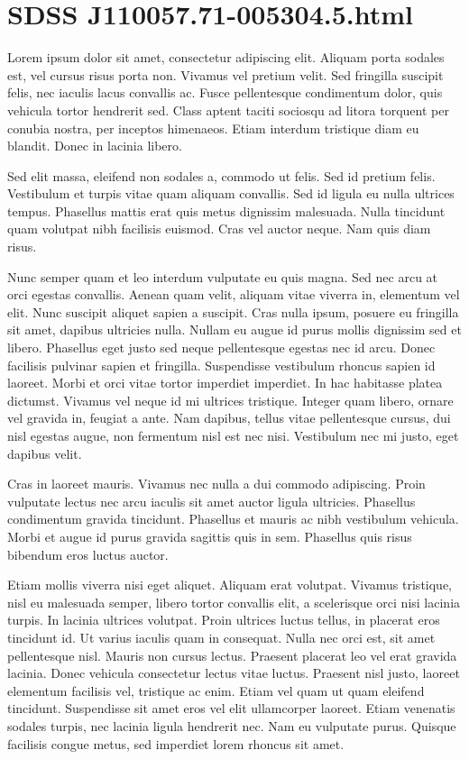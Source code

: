 \documentclass{emulateapj}
\begin{document}
\section{SDSS J110057.71-005304.5.html}
Lorem ipsum dolor sit amet, consectetur adipiscing elit. Aliquam porta sodales est, vel cursus risus porta non. Vivamus vel pretium velit. Sed fringilla suscipit felis, nec iaculis lacus convallis ac. Fusce pellentesque condimentum dolor, quis vehicula tortor hendrerit sed. Class aptent taciti sociosqu ad litora torquent per conubia nostra, per inceptos himenaeos. Etiam interdum tristique diam eu blandit. Donec in lacinia libero.

Sed elit massa, eleifend non sodales a, commodo ut felis. Sed id pretium felis. Vestibulum et turpis vitae quam aliquam convallis. Sed id ligula eu nulla ultrices tempus. Phasellus mattis erat quis metus dignissim malesuada. Nulla tincidunt quam volutpat nibh facilisis euismod. Cras vel auctor neque. Nam quis diam risus.

Nunc semper quam et leo interdum vulputate eu quis magna. Sed nec arcu at orci egestas convallis. Aenean quam velit, aliquam vitae viverra in, elementum vel elit. Nunc suscipit aliquet sapien a suscipit. Cras nulla ipsum, posuere eu fringilla sit amet, dapibus ultricies nulla. Nullam eu augue id purus mollis dignissim sed et libero. Phasellus eget justo sed neque pellentesque egestas nec id arcu. Donec facilisis pulvinar sapien et fringilla. Suspendisse vestibulum rhoncus sapien id laoreet. Morbi et orci vitae tortor imperdiet imperdiet. In hac habitasse platea dictumst. Vivamus vel neque id mi ultrices tristique. Integer quam libero, ornare vel gravida in, feugiat a ante. Nam dapibus, tellus vitae pellentesque cursus, dui nisl egestas augue, non fermentum nisl est nec nisi. Vestibulum nec mi justo, eget dapibus velit.

Cras in laoreet mauris. Vivamus nec nulla a dui commodo adipiscing. Proin vulputate lectus nec arcu iaculis sit amet auctor ligula ultricies. Phasellus condimentum gravida tincidunt. Phasellus et mauris ac nibh vestibulum vehicula. Morbi et augue id purus gravida sagittis quis in sem. Phasellus quis risus bibendum eros luctus auctor.

Etiam mollis viverra nisi eget aliquet. Aliquam erat volutpat. Vivamus tristique, nisl eu malesuada semper, libero tortor convallis elit, a scelerisque orci nisi lacinia turpis. In lacinia ultrices volutpat. Proin ultrices luctus tellus, in placerat eros tincidunt id. Ut varius iaculis quam in consequat. Nulla nec orci est, sit amet pellentesque nisl. Mauris non cursus lectus. Praesent placerat leo vel erat gravida lacinia. Donec vehicula consectetur lectus vitae luctus. Praesent nisl justo, laoreet elementum facilisis vel, tristique ac enim. Etiam vel quam ut quam eleifend tincidunt. Suspendisse sit amet eros vel elit ullamcorper laoreet. Etiam venenatis sodales turpis, nec lacinia ligula hendrerit nec. Nam eu vulputate purus. Quisque facilisis congue metus, sed imperdiet lorem rhoncus sit amet.
\end{document}

